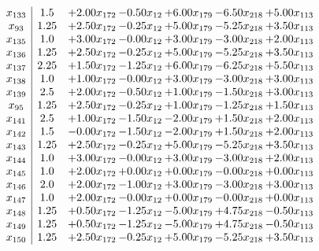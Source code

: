 \documentclass[8pt]{article}
\begin{document}
\[\begin{array}{c| c c@{\hskip 2pt} c@{\hskip 2pt} c@{\hskip 2pt} c@{\hskip 2pt} c@{\hskip 2pt} }
 x_{133}   &  1.5 & +  2.00 x_{172} & -0.50 x_{12} & +  6.00 x_{179} & -6.50 x_{218} & +  5.00 x_{113}\\
 x_{93}   &  1.25 & +  2.50 x_{172} & -0.25 x_{12} & +  5.00 x_{179} & -5.25 x_{218} & +  3.50 x_{113}\\
 x_{135}   &  1.0 & +  3.00 x_{172} & -0.00 x_{12} & +  3.00 x_{179} & -3.00 x_{218} & +  2.00 x_{113}\\
 x_{136}   &  1.25 & +  2.50 x_{172} & -0.25 x_{12} & +  5.00 x_{179} & -5.25 x_{218} & +  3.50 x_{113}\\
 x_{137}   &  2.25 & +  1.50 x_{172} & -1.25 x_{12} & +  6.00 x_{179} & -6.25 x_{218} & +  5.50 x_{113}\\
 x_{138}   &  1.0 & +  1.00 x_{172} & -0.00 x_{12} & +  3.00 x_{179} & -3.00 x_{218} & +  3.00 x_{113}\\
 x_{139}   &  2.5 & +  2.00 x_{172} & -0.50 x_{12} & +  1.00 x_{179} & -1.50 x_{218} & +  3.00 x_{113}\\
 x_{95}   &  1.25 & +  2.50 x_{172} & -0.25 x_{12} & +  1.00 x_{179} & -1.25 x_{218} & +  1.50 x_{113}\\
 x_{141}   &  2.5 & +  1.00 x_{172} & -1.50 x_{12} & -2.00 x_{179} & +  1.50 x_{218} & +  2.00 x_{113}\\
 x_{142}   &  1.5 & -0.00 x_{172} & -1.50 x_{12} & -2.00 x_{179} & +  1.50 x_{218} & +  2.00 x_{113}\\
 x_{143}   &  1.25 & +  2.50 x_{172} & -0.25 x_{12} & +  5.00 x_{179} & -5.25 x_{218} & +  3.50 x_{113}\\
 x_{144}   &  1.0 & +  3.00 x_{172} & -0.00 x_{12} & +  3.00 x_{179} & -3.00 x_{218} & +  2.00 x_{113}\\
 x_{145}   &  1.0 & +  2.00 x_{172} & +  0.00 x_{12} & +  0.00 x_{179} & -0.00 x_{218} & +  0.00 x_{113}\\
 x_{146}   &  2.0 & +  2.00 x_{172} & -1.00 x_{12} & +  3.00 x_{179} & -3.00 x_{218} & +  3.00 x_{113}\\
 x_{147}   &  1.0 & +  2.00 x_{172} & -0.00 x_{12} & +  0.00 x_{179} & -0.00 x_{218} & +  0.00 x_{113}\\
 x_{148}   &  1.25 & +  0.50 x_{172} & -1.25 x_{12} & -5.00 x_{179} & +  4.75 x_{218} & -0.50 x_{113}\\
 x_{149}   &  1.25 & +  0.50 x_{172} & -1.25 x_{12} & -5.00 x_{179} & +  4.75 x_{218} & -0.50 x_{113}\\
 x_{150}   &  1.25 & +  2.50 x_{172} & -0.25 x_{12} & +  5.00 x_{179} & -5.25 x_{218} & +  3.50 x_{113}\\

\end{array}\]
\end{document}

